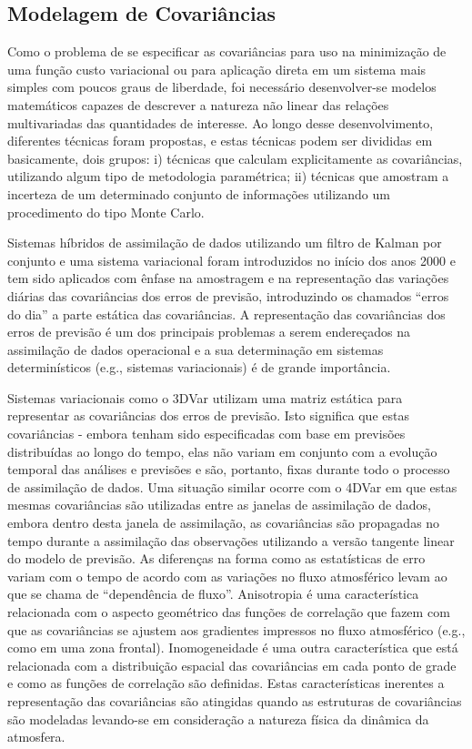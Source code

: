 \subsection{Modelagem de Covariâncias}
\label{mod_covars}

Como o problema de se especificar as covariâncias para uso na minimização de uma função custo variacional ou para aplicação direta em um sistema mais simples com poucos graus de liberdade, foi necessário desenvolver-se modelos matemáticos capazes de descrever a natureza não linear das relações multivariadas das quantidades de interesse. Ao longo desse desenvolvimento, diferentes técnicas foram propostas, e estas técnicas podem ser divididas em basicamente, dois grupos: i) técnicas que calculam explicitamente as covariâncias, utilizando algum tipo de metodologia paramétrica; ii) técnicas que amostram a incerteza de um determinado conjunto de informações utilizando um procedimento do tipo Monte Carlo.

Sistemas híbridos de assimilação de dados utilizando um filtro de Kalman por conjunto e uma sistema variacional foram introduzidos no início dos anos 2000 \cite{hamillesnyder/2000,lorenc/2003,zupanski/2005} e tem sido aplicados com ênfase na amostragem e na representação das variações diárias das covariâncias dos erros de previsão, introduzindo os chamados ``erros do dia'' \cite{corazzaetal/2003} a parte estática das covariâncias. A representação das covariâncias dos erros de previsão é um dos principais problemas a serem endereçados na assimilação de dados operacional e a sua determinação em sistemas determinísticos (e.g., sistemas variacionais) é de grande importância.

Sistemas variacionais como o 3DVar utilizam uma matriz estática para representar as covariâncias dos erros de previsão. Isto significa que estas covariâncias - embora tenham sido especificadas com base em previsões distribuídas ao longo do tempo, elas não variam em conjunto com a evolução temporal das análises e previsões e são, portanto, fixas durante todo o processo de assimilação de dados. Uma situação similar ocorre com o 4DVar em que estas mesmas covariâncias são utilizadas entre as janelas de assimilação de dados, embora dentro desta janela de assimilação, as covariâncias são propagadas no tempo durante a assimilação das observações utilizando a versão tangente linear do modelo de previsão. As diferenças na forma como as estatísticas de erro variam com o tempo de acordo com as variações no fluxo atmosférico levam ao que se chama de ``dependência de fluxo''. Anisotropia é uma característica relacionada com o aspecto geométrico das funções de correlação que fazem com que as covariâncias se ajustem aos gradientes impressos no fluxo atmosférico (e.g., como em uma zona frontal). Inomogeneidade é uma outra característica que está relacionada com a distribuição espacial das covariâncias em cada ponto de grade e como as funções de correlação são definidas. Estas características inerentes a representação das covariâncias são atingidas quando as estruturas de covariâncias são modeladas levando-se em consideração a natureza física da dinâmica da atmosfera.

